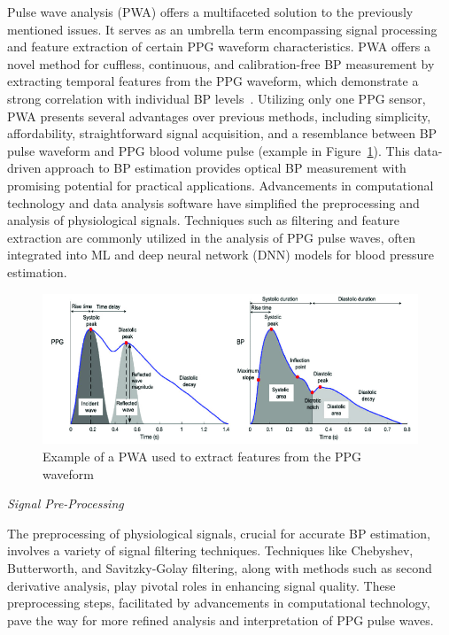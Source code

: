 Pulse wave analysis (PWA) offers a multifaceted solution to the previously mentioned issues.
It serves as an umbrella term encompassing signal processing and feature extraction of certain PPG waveform characteristics.
PWA offers a novel method for cuffless, continuous, and calibration-free BP measurement by extracting temporal features from the PPG waveform, which demonstrate a strong correlation with individual BP levels~\cite{elgendiAnalysisFingertipPhotoplethysmogram2012}.
Utilizing only one PPG sensor, PWA presents several advantages over previous methods, including simplicity, affordability, straightforward signal acquisition, and a resemblance between BP pulse waveform and PPG blood volume pulse (example in Figure~\ref{fig:pwa}).
This data-driven approach to BP estimation provides optical BP measurement with promising potential for practical applications.
Advancements in computational technology and data analysis software have simplified the preprocessing and analysis of physiological signals.
Techniques such as filtering and feature extraction are commonly utilized in the analysis of PPG pulse waves, often integrated into ML and deep neural network (DNN) models for blood pressure estimation.
\begin{figure}[h]
    \centering
    \includegraphics[scale=1.8]{images/sp/pwa}
    \caption{Example of a PWA used to extract features from the PPG waveform~\cite{bikiaLeveragingPotentialMachine2021}}
    \label{fig:pwa}
\end{figure}

\vspace{0.2cm}
\textit{Signal Pre-Processing}
\vspace{0.2cm}

The preprocessing of physiological signals, crucial for accurate BP estimation, involves a variety of signal filtering techniques.
Techniques like Chebyshev, Butterworth, and Savitzky-Golay filtering, along with methods such as second derivative analysis, play pivotal roles in enhancing signal quality.
These preprocessing steps, facilitated by advancements in computational technology, pave the way for more refined analysis and interpretation of PPG pulse waves.

